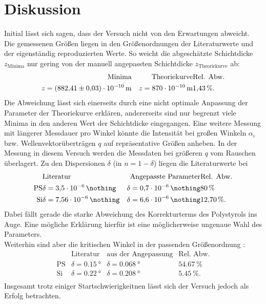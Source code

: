 \section{Diskussion}
Initial lässt sich sagen, dass der Versuch nicht von den Erwartungen abweicht.
Die gemessenen Größen liegen in den Größenordnungen der Literaturwerte und der eigenständig reproduzierten Werte.
So weicht die abgeschätzte Schichtdicke $z_{\text{Minima}}$ nur gering von der manuell angepassten Schichtdicke $z_{\text{Theoriekurve}}$ ab:
\begin{align*}
		\text{Minima}					 && \text{Theoriekurve}  	& \text{Rel. Abw.}		\\
		z = \SI{882.41 \pm 0.03 e-10}{m} && z = \SI{870e-10}{m}		& \SI{1.43}{\%}. 		\\
\end{align*}
Die Abweichung lässt sich einerseits durch eine nicht optimale Anpassung der Parameter der Theoriekurve erklären, andererseits sind nur begrenzt viele Minima in den anderen Wert der Schichtdicke eingegangen.
Eine weitere Messung mit längerer Messdauer pro Winkel könnte die Intensität bei großen Winkeln $\alpha_i$ bzw. Wellenvektorüberträgen $q$ auf repräsentative Größen anheben.
In der Messung in diesem Versuch werden die Messdaten bei größeren $q$ vom Rauschen überlagert.
Zu den Dispersionen $\delta$ (in $n = 1 - \delta$) liegen die Literaturwerte \cite{TOL} bei
\begin{align*}
				& \text{Literatur}					& \text{Angepasste Parameter} 		& \text{Rel. Abw.}	\\
	\text{PS}	& \delta = \SI{3.5e-6}{\nothing}	& \delta = \SI{0.7e-6}{\nothing}	& \SI{80}{\%} 		\\
	\text{Si}	& \delta = \SI{7.56e-6}{\nothing}	& \delta = \SI{6.6e-6}{\nothing}	& \SI{12.70}{\%}.	\\
\end{align*}
Dabei fällt gerade die starke Abweichung des Korrekturterms des Polystyrols ins Auge.
Eine mögliche Erklärung hierfür ist eine möglicherweise ungenaue Wahl des Parameters.\\
Weiterhin sind aber die kritischen Winkel in der passenden Größenordnung \cite{TOL}:
\begin{align*}
			& \text{Literatur}		& \text{aus der Angepassung} 	& \text{Rel. Abw.}	\\
\text{PS}	& \delta = \SI{0.15}{°}	& \delta = \SI{0.068}{°}		& \SI{54.67}{\%} 	\\
\text{Si}	& \delta = \SI{0.22}{°}	& \delta = \SI{0.208}{°}		& \SI{5.45}{\%}.	\\
\end{align*}
Insgesamt trotz einiger Startschwierigkeitnen lässt sich der Versuch jedoch als Erfolg betrachten.

